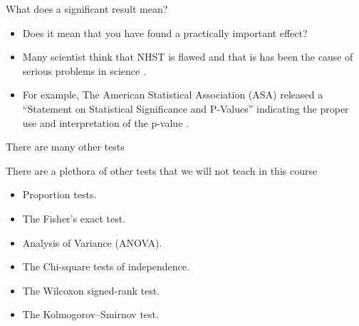 \documentclass[handout]{beamer}
\begin{document}
\begin{frame}{What does a significant result mean?}
\scriptsize{
\begin{itemize}

 \item  Does it mean that you have found a practically important effect?
\item  Many scientist think that NHST is flawed and that is has been the cause of serious problems in science \cite{poldrack2019statistical}.

 \item For example, The American Statistical Association (ASA) released a ``Statement on Statistical Significance and P-Values'' indicating the proper use and interpretation of the p-value \cite{wasserstein2016asa}.
 
\end{itemize}
}
 
\end{frame}


\begin{frame}{There are many other tests}
 \scriptsize{
There are a plethora of other tests that we will not teach in this course
 
\begin{itemize}
 \item Proportion tests.
 \item The Fisher's exact test.
 \item Analysis of Variance (ANOVA).
 \item The Chi-square tests of independence.
 \item The Wilcoxon signed-rank test.
 \item The Kolmogorov–Smirnov test. 
 
\end{itemize}


}
\end{frame}
\end{document}
